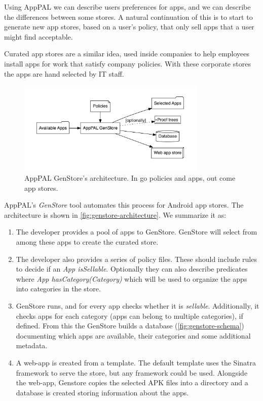 \documentclass[thesis.tex]{subfiles}
\begin{document}
Using AppPAL we can describe users preferences for apps, and we can describe
the differences between some stores.  A natural continuation of this is
to start to generate new app stores, based on a user's policy, that only sell
apps that a user might find acceptable.

Curated app stores are a similar idea, used inside companies to help employees
install apps for work that satisfy company policies.  With these corporate stores the apps are hand selected
by IT staff.  

\begin{figure}\centering
  \includegraphics[width=0.8\textwidth]{figures/genstore.pdf}
  \caption[AppPAL GenStore's architecture.]{AppPAL GenStore's architecture.  In go policies and apps, out come app stores.}
  \label{fig:genstore-architecture}
\end{figure}

AppPAL's \emph{GenStore} tool automates this process for Android app stores. The
architecture is shown in \autoref{fig:genstore-architecture}. We summarize it
as:

\begin{enumerate}
\item The developer provides a pool of apps to GenStore. GenStore will select
  from among these apps to create the curated store.
\item The developer also provides a series of policy files. These should include
  rules to decide if an \emph{App isSellable}. Optionally they can also describe
  predicates where \emph{App hasCategory(Category)} which will be used to organize
  the apps into categories in the store.
\item GenStore runs, and for every app checks whether it is \emph{sellable}.
  Additionally, it checks apps for each category (apps can belong to multiple
  categories), if defined. From this the GenStore builds a database
  (\autoref{fig:genstore-schema}) documenting which apps are available, their
  categories and some additional metadata.
\item A web-app is created from a template. The default template uses the Sinatra
  framework to serve the store, but any framework could be used. Alongside the
  web-app, Genstore copies the selected APK files into a directory and a database
  is created storing information about the apps.
\end{enumerate}
\end{document}
